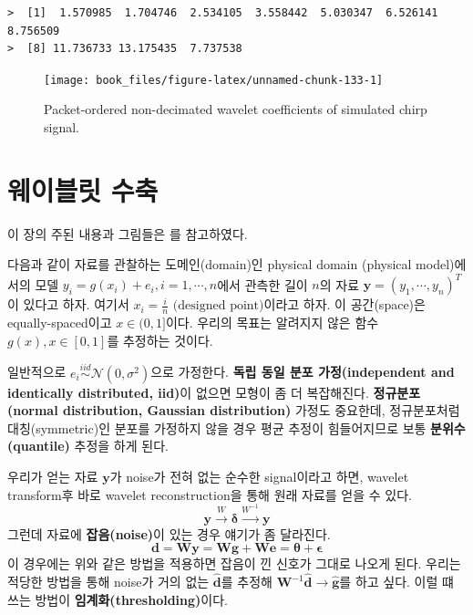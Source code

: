 \documentclass[b5paper,]{scrbook}
\makeatletter
\newenvironment{Shaded}{\begin{snugshade}}{\end{snugshade}}
\newcommand{\KeywordTok}[1]{\textcolor[rgb]{0.13,0.29,0.53}{\textbf{{#1}}}}
\newcommand{\DataTypeTok}[1]{\textcolor[rgb]{0.13,0.29,0.53}{{#1}}}
\newcommand{\DecValTok}[1]{\textcolor[rgb]{0.00,0.00,0.81}{{#1}}}
\newcommand{\StringTok}[1]{\textcolor[rgb]{0.31,0.60,0.02}{{#1}}}
\newcommand{\NormalTok}[1]{{#1}}
\theoremstyle{plain}
\theoremstyle{definition}
\numberwithin{equation}{section}
\newenvironment{kframe}{%
\medskip{}
\setlength{\fboxsep}{.8em}
 \def\at@end@of@kframe{}%
 \ifinner\ifhmode%
  \def\at@end@of@kframe{\end{minipage}}%
  \begin{minipage}{\columnwidth}%
 \fi\fi%
 \def\FrameCommand##1{\hskip\@totalleftmargin \hskip-\fboxsep
 \colorbox{shadecolor}{##1}\hskip-\fboxsep
     \hskip-\linewidth \hskip-\@totalleftmargin \hskip\columnwidth}%
 \MakeFramed {\advance\hsize-\width
   \@totalleftmargin\z@ \linewidth\hsize
   \@setminipage}}%
 {\par\unskip\endMakeFramed%
 \at@end@of@kframe}
\renewenvironment{Shaded}{\begin{kframe}}{\end{kframe}}
\makeatother
\begin{document}
\begin{verbatim}
>  [1]  1.570985  1.704746  2.534105  3.558442  5.030347  6.526141  8.756509
>  [8] 11.736733 13.175435  7.737538
\end{verbatim}

\begin{Shaded}
\end{Shaded}

\begin{figure}

{\centering \texttt{[image: book\_files/figure-latex/unnamed-chunk-133-1]} 

}

\caption{Packet-ordered non-decimated wavelet coefficients of simulated chirp signal.}\label{fig:unnamed-chunk-133}
\end{figure}

\chapter{웨이블릿 수축}\label{waveletshrinkage}

이 장의 주된 내용과 그림들은 \citep{Nason2010}를 참고하였다.

다음과 같이 자료를 관찰하는 도메인(domain)인 physical domain (physical
model)에서의 모델 \(y_{i}=g(x_{i})+e_{i}, i=1,\cdots,n\)에서 관측한 길이
\(n\)의 자료 \(\mathbf{y}=(y_{1},\cdots,y_{n})^{T}\)이 있다고 하자.
여기서 \(x_{i}=\frac{i}{n} \text{ (designed point)}\)이라고 하자. 이
공간(space)은 equally-spaced이고 \(x \in (0, 1]\)이다. 우리의 목표는
알려지지 않은 함수 \(g(x), x \in [0,1]\)를 추정하는 것이다.

일반적으로 \(e_{i} \stackrel{iid}{\sim} \mathcal{N}(0,\sigma^{2})\)으로
가정한다. \textbf{독립 동일 분포 가정(independent and identically
distributed, iid)}이 없으면 모형이 좀 더 복잡해진다.
\textbf{정규분포(normal distribution, Gaussian distribution)} 가정도
중요한데, 정규분포처럼 대칭(symmetric)인 분포를 가정하지 않을 경우 평균
추정이 힘들어지므로 보통 \textbf{분위수(quantile)} 추정을 하게 된다.

우리가 얻는 자료 \(\mathbf{y}\)가 noise가 전혀 없는 순수한 signal이라고
하면, wavelet transform후 바로 wavelet reconstruction을 통해 원래 자료를
얻을 수 있다.
\[\mathbf{y} \xrightarrow{W} \boldsymbol{\delta} \xrightarrow{W^{-1}} \mathbf{y}\]
그런데 자료에 \textbf{잡음(noise)}이 있는 경우 얘기가 좀 달라진다.
\[\mathbf{d}=\mathbf{Wy} =\mathbf{Wg}+\mathbf{We}=\boldsymbol{\theta}+\boldsymbol{\epsilon}\]
이 경우에는 위와 같은 방법을 적용하면 잡음이 낀 신호가 그대로 나오게
된다. 우리는 적당한 방법을 통해 noise가 거의 없는 \(\hat{\mathbf{d}}\)를
추정해
\(\mathbf{W}^{-1}\hat{\mathbf{d}} \rightarrow \hat{\mathbf{g}}\)를 하고
싶다. 이럴 떄 쓰는 방법이 \textbf{임계화(thresholding)}이다.
\end{document}

